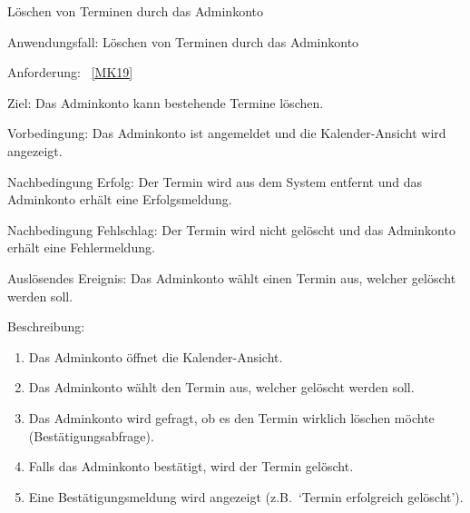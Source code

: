 \pagebreak

\begin{function}{50}{Löschen von Terminen durch das Adminkonto}
    \item[Anwendungsfall:] Löschen von Terminen durch das Adminkonto
    \item[Anforderung:] ~\ref{MK19}
    \item[Ziel:] Das Adminkonto kann bestehende Termine löschen.
    \item[Vorbedingung:] Das Adminkonto ist angemeldet und die Kalender-Ansicht wird angezeigt.
    \item[Nachbedingung Erfolg:] Der Termin wird aus dem System entfernt und das Adminkonto erhält eine Erfolgsmeldung.
    \item[Nachbedingung Fehlschlag:] Der Termin wird nicht gelöscht und das Adminkonto erhält eine Fehlermeldung.
    \item[Auslösendes Ereignis:] Das Adminkonto wählt einen Termin aus, welcher gelöscht werden soll.
    \item[Beschreibung:] ~
    \begin{enumerate}
        \item Das Adminkonto öffnet die Kalender-Ansicht.
        \item Das Adminkonto wählt den Termin aus, welcher gelöscht werden soll.
        \item Das Adminkonto wird gefragt, ob es den Termin wirklich löschen möchte (Bestätigungsabfrage).
        \item Falls das Adminkonto bestätigt, wird der Termin gelöscht.
        \item Eine Bestätigungsmeldung wird angezeigt (z.B.\ `Termin erfolgreich gelöscht').
    \end{enumerate}
\end{function}

\pagebreak

